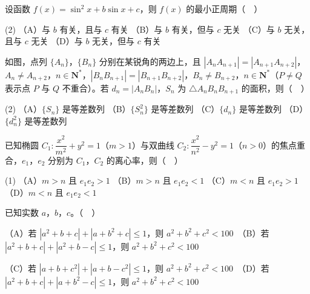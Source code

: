 \begin{question}
设函数 \(f(x)=\sin^{2}x+b\sin x+c\)，则 \(f(x)\) 的最小正周期（　）

\begin{gkopts}(2)
\task （A）与 \(b\) 有关，且与 \(c\) 有关
\task （B）与 \(b\) 有关，但与 \(c\) 无关
\task （C）与 \(b\) 无关，且与 \(c\) 无关
\task （D）与 \(b\) 无关，但与 \(c\) 有关
\end{gkopts}

\Needspace{0.4\textheight}
\end{question}
\begin{question}
如图，点列 \(\{A_{n}\}\)，\(\{B_{n}\}\) 分别在某锐角的两边上，且 \(|A_{n}A_{n+1}|=|A_{n+1}A_{n+2}|\)，\(A_{n}\neq A_{n+2}\)，\(n\in\mathbf{N}^{*}\)，\(|B_{n}B_{n+1}|=|B_{n+1}B_{n+2}|\)，\(B_{n}\neq B_{n+2}\)，\(n\in\mathbf{N}^{*}\)（\(P\neq Q\) 表示点 \(P\) 与 \(Q\) 不重合）。若 \(d_{n}=|A_{n}B_{n}|\)，\(S_{n}\) 为 \(\triangle A_{n}B_{n}B_{n+1}\) 的面积，则（　）
\nopagebreak[4]
\begin{center}\end{center}
\nopagebreak[4]
\begin{gkopts}(2)
\task （A）\(\{S_{n}\}\) 是等差数列
\task （B）\(\{S_{n}^{2}\}\) 是等差数列
\task （C）\(\{d_{n}\}\) 是等差数列
\task （D）\(\{d_{n}^{2}\}\) 是等差数列
\end{gkopts}

\end{question}
\begin{question}
已知椭圆 \(C_{1}:\dfrac{x^{2}}{m^{2}}+y^{2}=1\)（\(m>1\)）与双曲线 \(C_{2}:\dfrac{x^{2}}{n^{2}}-y^{2}=1\)（\(n>0\)）的焦点重合，\(e_{1}\)，\(e_{2}\) 分别为 \(C_{1}\)，\(C_{2}\) 的离心率，则（　）

\begin{gkopts}(1)
\task （A）\(m>n\) 且 \(e_{1}e_{2}>1\)
\task （B）\(m>n\) 且 \(e_{1}e_{2}<1\)
\task （C）\(m<n\) 且 \(e_{1}e_{2}>1\)
\task （D）\(m<n\) 且 \(e_{1}e_{2}<1\)
\end{gkopts}

\end{question}
\begin{question}
已知实数 \(a\)，\(b\)，\(c\)。（　）

（A）若 \(|a^{2}+b+c|+|a+b^{2}+c|\leqslant 1\)，则 \(a^{2}+b^{2}+c^{2}<100\)　（B）若 \(|a^{2}+b+c|+|a^{2}+b-c|\leqslant 1\)，则 \(a^{2}+b^{2}+c^{2}<100\)

（C）若 \(|a+b+c^{2}|+|a+b-c^{2}|\leqslant 1\)，则 \(a^{2}+b^{2}+c^{2}<100\)　（D）若 \(|a^{2}+b+c|+|a+b^{2}-c|\leqslant 1\)，则 \(a^{2}+b^{2}+c^{2}<100\)

\end{question}

